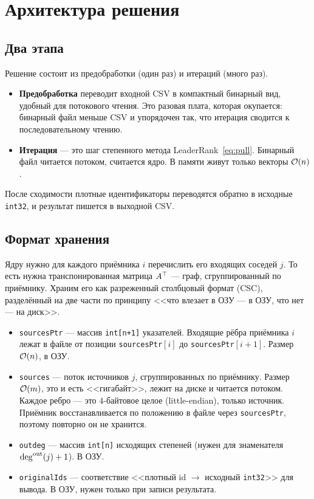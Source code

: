 \section{Архитектура решения}
\label{sec:arch}

\subsection{Два этапа}
Решение состоит из предобработки (один раз) и итераций (много раз).
\begin{itemize}[nosep]
  \item \textbf{Предобработка} переводит входной CSV в компактный бинарный вид, удобный для
        потокового чтения. Это разовая плата, которая окупается: бинарный файл меньше CSV и упорядочен
        так, что итерация сводится к последовательному чтению.
  \item \textbf{Итерация} --- это шаг степенного метода LeaderRank~\eqref{eq:pull}. Бинарный файл
        читается потоком, считается ядро. В памяти живут только векторы $\mathcal{O}(n)$.
\end{itemize}
После сходимости плотные идентификаторы переводятся обратно в исходные \texttt{int32}, и результат
пишется в выходной CSV.

\subsection{Формат хранения}
\label{sec:format}
Ядру нужно для каждого приёмника $i$ перечислить его входящих соседей $j$. То есть нужна
транспонированная матрица $A^{\top}$ --- граф, сгруппированный по приёмнику. Храним его как разреженный
столбцовый формат (CSC), разделённый на две части по принципу <<что влезает в ОЗУ --- в ОЗУ, что нет
--- на диск>>.
\begin{itemize}[itemsep=2pt]
  \item \texttt{sourcesPtr} --- массив \texttt{int[n+1]} указателей. Входящие рёбра приёмника $i$
        лежат в файле от позиции \texttt{sourcesPtr}$[i]$ до \texttt{sourcesPtr}$[i{+}1]$. Размер
        $\mathcal{O}(n)$, в ОЗУ.
  \item \texttt{sources} --- поток источников $j$, сгруппированных по приёмнику. Размер $\mathcal{O}(m)$,
        это и есть <<гигабайт>>, лежит на диске и читается потоком. Каждое ребро --- это $4$-байтовое
        целое (little-endian), только источник. Приёмник восстанавливается по положению в файле через
        \texttt{sourcesPtr}, поэтому повторно он не хранится.
  \item \texttt{outdeg} --- массив \texttt{int[n]} исходящих степеней (нужен для знаменателя
        $\deg^{\mathrm{out}}(j)+1$). В ОЗУ.
  \item \texttt{originalIds} --- соответствие <<плотный id $\to$ исходный \texttt{int32}>> для вывода.
        В ОЗУ, нужен только при записи результата.
\end{itemize}

